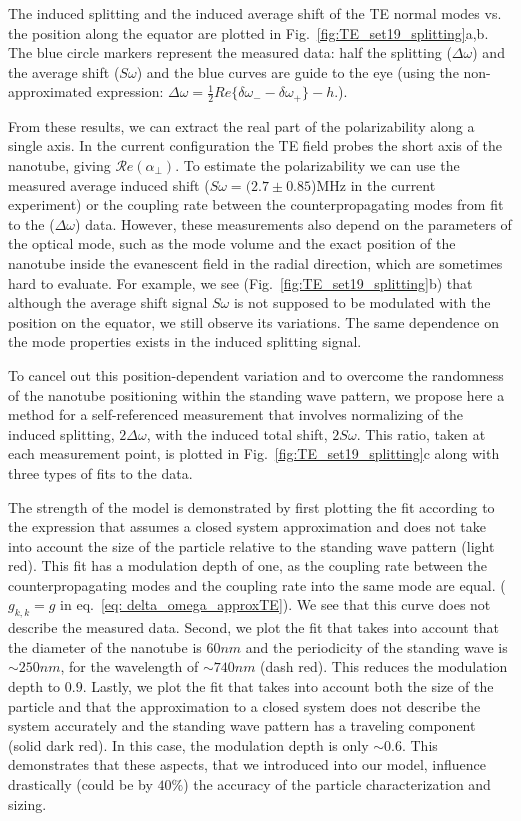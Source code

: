 \documentclass[journal=jacsat,manuscript=article]{achemso}
\begin{document}
The induced splitting and the induced average shift of the TE normal modes vs. the position along the equator are plotted in Fig.~\ref{fig:TE_set19_splitting}a,b. The blue circle markers represent the measured data: half the splitting ($\Delta \omega$) and the average shift ($\textit{S} \omega$) and the blue curves are guide to the eye (using the non-approximated expression: $\Delta\omega = \frac{1}{2}Re\{\delta\omega_- -\delta\omega_+\}-h$.).

From these results, we can extract the real part of the polarizability along a single axis. In the current configuration the TE field probes the short axis of the nanotube, giving $\mathcal{R}e(\alpha_{\perp})$. To estimate the polarizability we can use the measured average induced shift ($S\omega = (2.7 \pm 0.85$)MHz in the current experiment) or the coupling rate between the counterpropagating modes from fit to the ($\Delta \omega$) data. However, these measurements also depend on the parameters of the optical mode, such as the mode volume and the exact position of the nanotube inside the evanescent field in the radial direction, which are sometimes hard to evaluate. For example, we see (Fig.~\ref{fig:TE_set19_splitting}b) that although the average shift signal $S\omega$ is not supposed to be modulated with the position on the equator, we still observe its variations. The same dependence on the mode properties exists in the induced splitting signal.

To cancel out this position-dependent variation and to overcome the randomness of the nanotube positioning within the standing wave pattern, we propose here a method for a self-referenced measurement that involves normalizing of the induced splitting, $2\Delta\omega$, with the induced total shift, $2S\omega$. This ratio, taken at each measurement point, is plotted in Fig.~\ref{fig:TE_set19_splitting}c along with three types of fits to the data.

The strength of the model is demonstrated by first plotting the fit according to the expression that assumes a closed system approximation and does not take into account the size of the particle relative to the standing wave pattern (light red). This fit has a modulation depth of one, as the coupling rate between the counterpropagating modes and the coupling rate into the same mode are equal. ($g_{k,k}=g$ in eq.~\ref{eq: delta_omega_approxTE}). We see that this curve does not describe the measured data. Second, we plot the fit that takes into account that the diameter of the nanotube is $60nm$ and the periodicity of the standing wave is $\sim 250nm$, for the wavelength of $\sim740nm$ (dash red). This reduces the modulation depth to $0.9$. Lastly, we plot the fit that takes into account both the size of the particle and that the approximation to a closed system does not describe the system accurately and the standing wave pattern has a traveling component (solid dark red). In this case, the modulation depth is only $\sim0.6$. This demonstrates that these aspects, that we introduced into our model, influence drastically (could be by $40\%$) the accuracy of the particle characterization and sizing.
\end{document}
